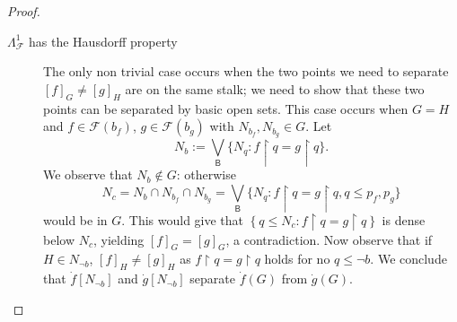 \documentclass[11pt]{amsart}
\newcommand{\F}{\mathcal{F}}
\newcommand{\Presh}{\textrm{Presh}}
\theoremstyle{plain}
\theoremstyle{definition}
\theoremstyle{plain}
\theoremstyle{remark}
\DeclareMathOperator{\RO}{\mathsf{RO}}
\newcommand{\bool}[1]{\mathsf{#1}}
\newcommand{\bp}[1]{\left\lbrace #1 \right\rbrace}
\newcommand{\0}{\mathsf{0}}
\renewcommand{\1}{\mathsf{1}}
\renewcommand{\2}{\mathsf{2}}
\theoremstyle{definition}
\begin{document}
 \begin{proof}
\emph{}

\begin{description}
\item[$\Lambda^1_\F$ has the Hausdorff property]
The only non trivial case occurs when the two points we need to separate $[f]_{G}\neq[g]_{H}$ are on the same stalk; we need to show that these two points can be separated by basic open sets. This case occurs when $G=H$ and $f\in\F(b_f)$, $g\in\F(b_g)$ with $N_{b_f},N_{b_g}\in G$. Let%
 \[
 N_b:=\bigvee_{\bool{B}}\{N_q: f\restriction q=g\restriction q\}.
 \]
 We observe that $N_b\notin G$: otherwise \[N_c=N_b\cap N_{b_f}\cap N_{b_g}=\bigvee_{\bool{B}}\{N_q: f\restriction q=g\restriction q, q\leq p_f, p_g\}
 \]
 would be in $G$. This would give that $\bp{q\leq N_c: f\restriction q=g\restriction q}$ is dense below $N_c$, yielding $[f]_{G}=[g]_{G}$, a contradiction.
 Now observe that if $H\in N_{\neg b}$, $[f]_{H}\neq [g]_{H}$ as 
 $ f\restriction q=g\restriction q$ holds for no $q\leq \neg b$. We conclude that $\dot{f}[N_{\neg b}]$ and $\dot{g}[N_{\neg b}]$ separate $\dot{f}(G)$ from $\dot{g}(G)$. 
%

\end{description}
\end{proof}
\end{document}
